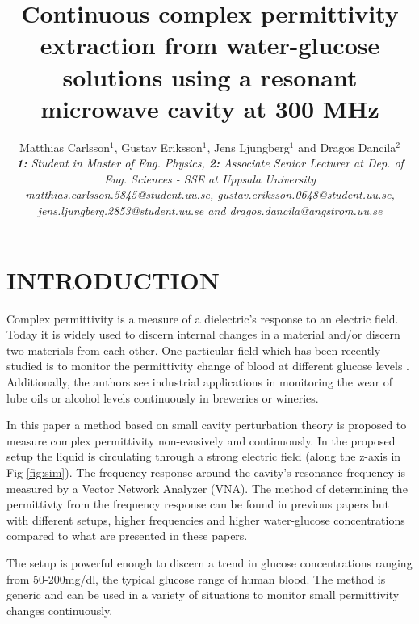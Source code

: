 \documentclass[10pt,final,conference,a4paper,twocolumn]{IEEEtran_AntennEMB_GigaHertz2016}
\begin{document}
\title{Continuous complex permittivity extraction from water-glucose solutions using a resonant microwave cavity at 300 MHz}

\author{Matthias Carlsson$^1$, Gustav Eriksson$^1$, Jens Ljungberg$^1$ and Dragos Dancila$^2$ \\
\em \small \textbf{1:} Student in Master of Eng. Physics, \textbf{2:} Associate Senior Lecturer at Dep. of Eng. Sciences - SSE at Uppsala University \\
\small matthias.carlsson.5845@student.uu.se, gustav.eriksson.0648@student.uu.se, \\
\small jens.ljungberg.2853@student.uu.se and dragos.dancila@angstrom.uu.se
}

\maketitle
\section{INTRODUCTION}
 Complex permittivity is a measure of a dielectric's response to an electric field. Today it is widely used to discern internal changes in a material and/or discern two materials from each other. One particular field which has been recently studied is to monitor the permittivity change of blood at different glucose levels \cite{c2}. Additionally, the authors see industrial applications in monitoring the wear of lube oils or alcohol levels continuously in breweries or wineries.
 
 In this paper a method based on small cavity perturbation theory \cite{c3} is proposed to measure complex permittivity non-evasively and continuously. In the proposed setup the liquid is circulating through a strong electric field (along the z-axis in Fig \ref{fig:sim}). The frequency response around the cavity's resonance frequency is measured by a Vector Network Analyzer (VNA). The method of determining the permittivty from the frequency response can be found in previous papers \cite{c2}\cite{c1} but with different setups, higher frequencies and higher water-glucose concentrations compared to what are presented in these papers.
 
 The setup is powerful enough to discern a trend in glucose concentrations ranging from 50-200mg/dl, the typical glucose range of human blood. The method is generic and can be used in a variety of situations to monitor small permittivity changes continuously.
\end{document}
